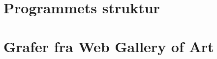 {

\chapter{Programmets struktur\label{appendix_struktur}}


\chapter{Grafer fra Web Gallery of Art\label{appendix_grafer}}


}

